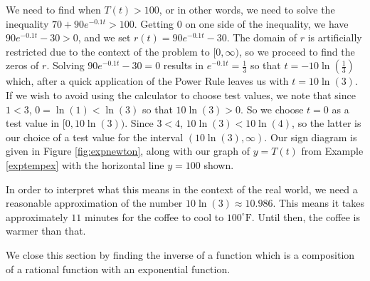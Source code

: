 {We need to find when $T(t) > 100$, or in other words, we need to solve the inequality  $70 + 90 e^{-0.1 t} > 100$.  Getting $0$ on one side of the inequality, we have  $90 e^{-0.1 t} - 30 > 0$, and we set $r(t) = 90 e^{-0.1 t} - 30$.  The domain of $r$ is artificially restricted due to the context of the problem to   $[0, \infty)$, so we proceed to find the zeros of $r$.  Solving $90 e^{-0.1 t} - 30=0$ results in $e^{-0.1t} = \frac{1}{3}$ so that $t = -10\ln\left(\frac{1}{3}\right)$ which, after a quick application of the Power Rule leaves us with $t = 10 \ln(3)$.  If we wish to avoid using the calculator to choose test values, we note that since $1 < 3$, $0 = \ln(1) < \ln(3)$ so that $10\ln(3) > 0$.  So we choose $t = 0$ as a test value in $[0, 10 \ln(3))$.  Since $3 < 4$, $10 \ln(3) < 10 \ln(4)$, so the latter is our choice of a test value for the interval $(10 \ln(3), \infty)$.  Our sign diagram is given in Figure \ref{fig:expnewton}, along with our graph of $y=T(t)$ from Example  \ref{exptempex} with the horizontal line $y = 100$ shown.   


In order to interpret what this means in the context of the real world, we need a reasonable approximation of the number $10 \ln(3) \approx 10.986$.  This means it takes approximately $11$ minutes for the coffee to cool to $100^{\circ}\mbox{F}$.  Until then, the coffee is warmer than that.
}

\medskip

We close this section by finding the inverse of a function which is a composition of a rational function with an exponential function.

\medskip

